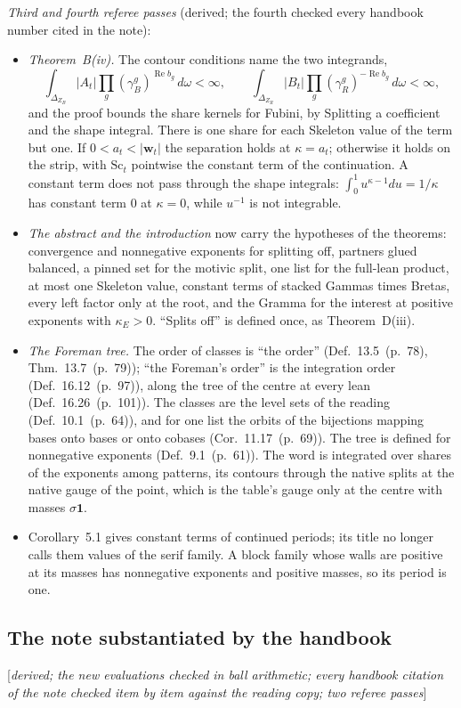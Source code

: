 \documentclass[11pt]{article}
\newcommand{\one}{\mathbf 1}
\DeclareMathOperator{\re}{Re}
\newcommand{\status}[1]{\hfill{\small[\textit{#1}]}}
\newcommand{\hb}[2]{#1~(p.~#2)}   %
\theoremstyle{plain}
\theoremstyle{remark}
\begin{document}
\emph{Third and fourth referee passes} (derived; the fourth checked every handbook number cited in the note):
\begin{itemize}
\item \emph{Theorem~B(iv).} The contour conditions name the two integrands,
\[
\int_{\Delta_{Z_B}}|A_t|\prod_g(\gamma^g_B)^{\re b_g}\,d\omega<\infty,\qquad \int_{\Delta_{Z_R}}|B_t|\prod_g(\gamma^g_R)^{-\re b_g}\,d\omega<\infty,
\]
and the proof bounds the share kernels for Fubini, by Splitting a coefficient and the shape integral. There is one share for each Skeleton value of the term but one. If $0<a_t<|\mathbf w_t|$ the separation holds at $\kappa=a_t$; otherwise it holds on the strip, with $\mathrm{Sc}_t$ pointwise the constant term of the continuation. A constant term does not pass through the shape integrals: $\int_0^1u^{\kappa-1}du=1/\kappa$ has constant term $0$ at $\kappa=0$, while $u^{-1}$ is not integrable.
\item \emph{The abstract and the introduction} now carry the hypotheses of the theorems: convergence and nonnegative exponents for splitting off, partners glued balanced, a pinned set for the motivic split, one list for the full-lean product, at most one Skeleton value, constant terms of stacked Gammas times Bretas, every left factor only at the root, and the Gramma for the interest at positive exponents with $\kappa_E>0$. ``Splits off'' is defined once, as Theorem~D(iii).
\item \emph{The Foreman tree.} The order of classes is ``the order'' (Def.~\hb{13.5}{78}, Thm.~\hb{13.7}{79}); ``the Foreman's order'' is the integration order (Def.~\hb{16.12}{97}), along the tree of the centre at every lean (Def.~\hb{16.26}{101}). The classes are the level sets of the reading (Def.~\hb{10.1}{64}), and for one list the orbits of the bijections mapping bases onto bases or onto cobases (Cor.~\hb{11.17}{69}). The tree is defined for nonnegative exponents (Def.~\hb{9.1}{61}). The word is integrated over shares of the exponents among patterns, its contours through the native splits at the native gauge of the point, which is the table's gauge only at the centre with masses $\sigma\one$.
\item Corollary~5.1 gives constant terms of continued periods; its title no longer calls them values of the serif family. A block family whose walls are positive at its masses has nonnegative exponents and positive masses, so its period is one.
\end{itemize}

\subsection{The note substantiated by the handbook}\status{derived; the new evaluations checked in ball arithmetic; every handbook citation of the note checked item by item against the reading copy; two referee passes}
\end{document}
